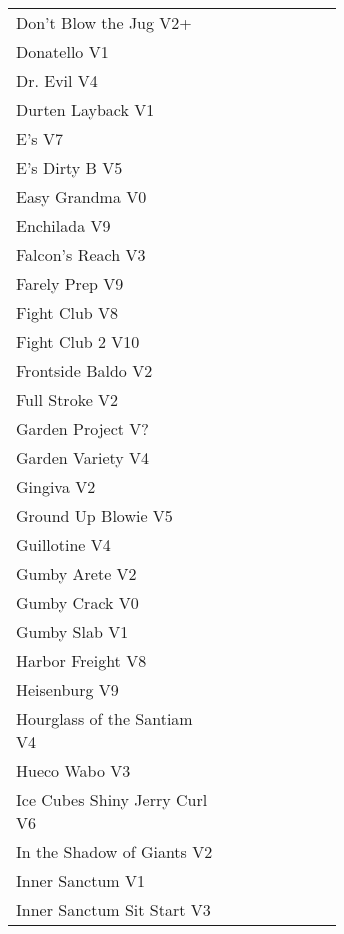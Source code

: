 \begin{flushleft}
\begin{center}
\begin{supertabular}{p{0.65\linewidth}r}
Don't Blow the Jug V2+ & \pageref{rt:Don't Blow the Jug} \\
Donatello V1 & \pageref{rt:Donatello} \\
Dr. Evil V4 & \pageref{rt:Dr. Evil} \\
Durten Layback V1 & \pageref{rt:Durten Layback} \\
E's V7 & \pageref{rt:E's} \\
E's Dirty B V5 & \pageref{rt:E's Dirty B} \\
Easy Grandma V0 & \pageref{rt:Easy Grandma} \\
Enchilada V9 & \pageref{rt:Enchilada} \\
Falcon's Reach V3 & \pageref{rt:Falcon's Reach} \\
Farely Prep V9 & \pageref{rt:Farely Prep} \\
Fight Club V8 & \pageref{rt:Fight Club} \\
Fight Club 2 V10 & \pageref{rt:Fight Club 2} \\
Frontside Baldo V2 & \pageref{rt:Frontside Baldo} \\
Full Stroke V2 & \pageref{rt:Full Stroke} \\
Garden Project V? & \pageref{rt:Garden Project} \\
Garden Variety V4 & \pageref{rt:Garden Variety} \\
Gingiva V2 & \pageref{rt:Gingiva} \\
Ground Up Blowie V5 & \pageref{rt:Ground Up Blowie} \\
Guillotine V4 & \pageref{rt:Guillotine} \\
Gumby Arete V2 & \pageref{rt:Gumby Arete} \\
Gumby Crack V0 & \pageref{rt:Gumby Crack} \\
Gumby Slab V1 & \pageref{rt:Gumby Slab} \\
Harbor Freight V8 & \pageref{vr:Harbor Freight} \\
Heisenburg V9 & \pageref{rt:Heisenburg} \\
Hourglass of the Santiam V4 & \pageref{rt:Hourglass of the Santiam} \\
Hueco Wabo V3 & \pageref{rt:Hueco Wabo} \\
Ice Cubes Shiny Jerry Curl V6 & \pageref{rt:Ice Cubes Shiny Jerry Curl} \\
In the Shadow of Giants V2 & \pageref{rt:In the Shadow of Giants} \\
Inner Sanctum V1 & \pageref{rt:Inner Sanctum} \\
Inner Sanctum Sit Start V3 & \pageref{vr:Inner Sanctum Sit Start} \\

\end{supertabular}
\end{center}
\end{flushleft}
